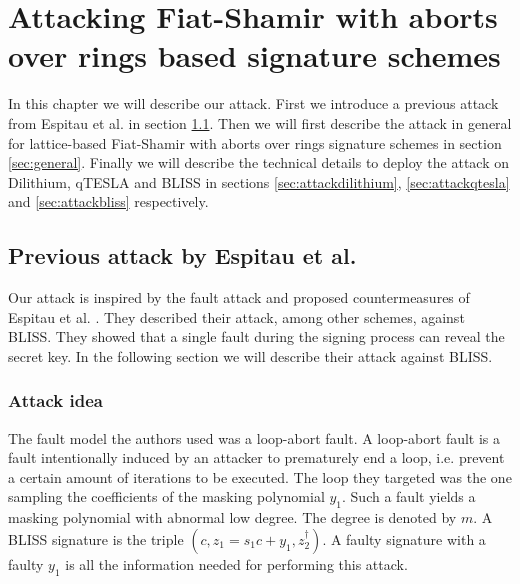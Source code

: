 %


\chapter{Attacking Fiat-Shamir with aborts over rings based signature schemes}
In this chapter we will describe our attack. First we introduce a previous attack from Espitau et al. \cite{espitau} in section \ref{sec:espitauattack}. %
Then we will first describe the attack in general for lattice-based Fiat-Shamir with aborts over rings signature schemes in section \ref{sec:general}.
Finally we will describe the technical details to deploy the attack on Dilithium, qTESLA and BLISS in sections \ref{sec:attackdilithium}, \ref{sec:attackqtesla} and \ref{sec:attackbliss} respectively.

\section{Previous attack by Espitau et al.}
\label{sec:espitauattack}
Our attack is inspired by the fault attack and proposed countermeasures of Espitau et al. \cite{espitau}. They described their attack, among other schemes, against BLISS. They showed that a single fault during the signing process can reveal the secret key. In the following section we will describe their attack against BLISS.

\subsection{Attack idea}
\label{sec:espitau:idea}
The fault model the authors used was a loop-abort fault. %
A loop-abort fault is a fault intentionally induced by an attacker to prematurely end a loop, i.e. prevent a certain amount of iterations to be executed.  
The loop they targeted was the one sampling the coefficients of the masking polynomial $y_1$. Such a fault yields a masking polynomial with abnormal low degree. The degree is denoted by $m$. A BLISS signature is the triple $(c, z_1 = s_1 c + y_1, z_2^\dagger)$. A faulty signature with a faulty $y_1$ is all the information needed for performing this attack.

